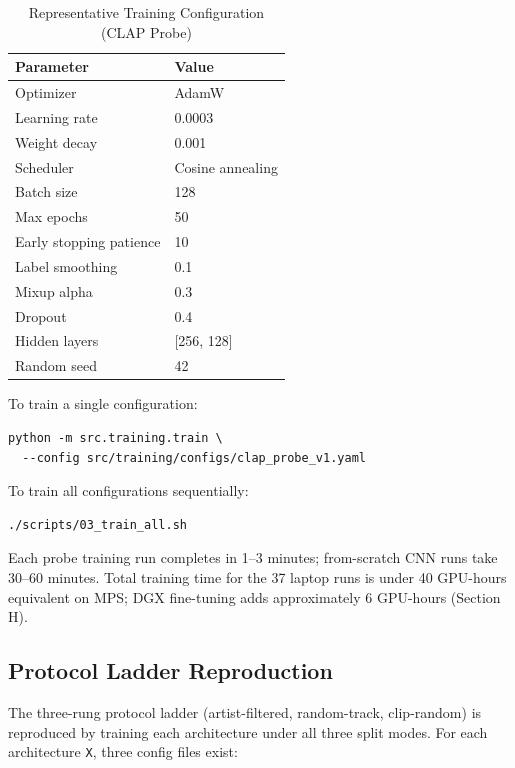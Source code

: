 \documentclass[conference]{IEEEtran}
\begin{document}
\begin{table}[h]
\centering
\footnotesize
\caption{Representative Training Configuration (CLAP Probe)}
\begin{tabular}{ll}
\toprule
\textbf{Parameter} & \textbf{Value} \\
\midrule
Optimizer & AdamW \\
Learning rate & 0.0003 \\
Weight decay & 0.001 \\
Scheduler & Cosine annealing \\
Batch size & 128 \\
Max epochs & 50 \\
Early stopping patience & 10 \\
Label smoothing & 0.1 \\
Mixup alpha & 0.3 \\
Dropout & 0.4 \\
Hidden layers & [256, 128] \\
Random seed & 42 \\
\bottomrule
\end{tabular}
\end{table}

To train a single configuration:

\begin{verbatim}
python -m src.training.train \
  --config src/training/configs/clap_probe_v1.yaml
\end{verbatim}

To train all configurations sequentially:

\begin{verbatim}
./scripts/03_train_all.sh
\end{verbatim}

Each probe training run completes in 1--3 minutes; from-scratch CNN
runs take 30--60 minutes. Total training time for the 37 laptop runs
is under 40 GPU-hours equivalent on MPS; DGX fine-tuning adds
approximately 6 GPU-hours (Section H).

\subsection{Protocol Ladder
Reproduction}\label{e.-protocol-ladder-reproduction}

The three-rung protocol ladder (artist-filtered, random-track,
clip-random) is reproduced by training each architecture under all three
split modes. For each architecture \texttt{X}, three config files exist:
\end{document}
